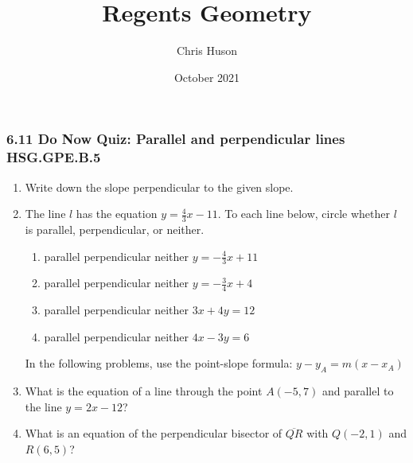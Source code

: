 \documentclass[12pt, twoside]{article}
\title{Regents Geometry}
\author{Chris Huson}
\date{October 2021}
\begin{document}
\subsubsection*{6.11 Do Now Quiz: Parallel and perpendicular lines \hfill HSG.GPE.B.5}
\begin{enumerate}
\item Write down the slope perpendicular to the given slope. \vspace{0.5cm}
  \begin{enumerate}
  \end{enumerate} \vspace{0.5cm}

\item The line $l$ has the equation $y=\frac{4}{3}x-11$. To each line below, circle whether $l$ is parallel, perpendicular, or neither.
  \begin{enumerate}
    \item parallel \quad perpendicular \quad neither \qquad $y=-\frac{4}{3}x+11$
    \vspace{0.25cm}
    \item parallel \quad perpendicular \quad neither \qquad $y=-\frac{3}{4}x+4$
    \vspace{0.25cm}
    \item parallel \quad perpendicular \quad neither \qquad $3x+4y=12$
    \vspace{1.5cm}
    \item parallel \quad perpendicular \quad neither \qquad $4x-3y=6$
    \vspace{1.7cm}
  \end{enumerate}

In the following problems, use the point-slope formula: $y-y_A=m (x-x_A)$
  \item What is the equation of a line through the point $A(-5,7)$ and parallel to the line $y=2x-12$?  \vspace{1.5cm}

  \item What is an equation of the perpendicular bisector of $\overline{QR}$ with $Q(-2,1)$ and $R(6,5)$? %

\end{enumerate}
\end{document}
